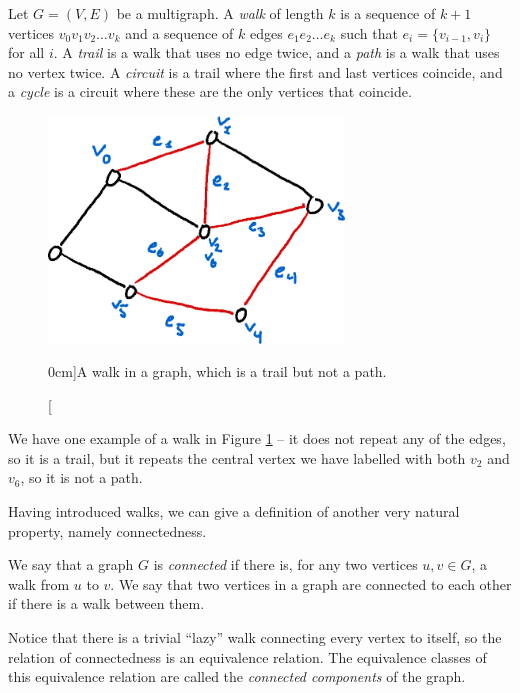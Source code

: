 \documentclass[nobib]{tufte-handout}
\begin{document}
\begin{definition}
    Let $G = (V, E)$ be a multigraph. A \emph{walk} of length $k$ is a sequence of $k+1$ vertices $v_0 v_1 v_2\ldots v_k$ and a sequence of $k$ edges $e_1e_2\ldots e_k$ such that $e_i = \{v_{i-1}, v_i\}$ for all $i$. A \emph{trail} is a walk that uses no edge twice, and a \emph{path} is a walk that uses no vertex twice. A \emph{circuit} is a trail where the first and last vertices coincide, and a \emph{cycle} is a circuit where these are the only vertices that coincide.
\end{definition}

\begin{figure}
    \centering
    \includegraphics[width=0.7\textwidth]{graphics/L2_eulerianity_subgraphs/walk_in_graph.png}
    \caption[][0cm]{A walk in a graph, which is a trail but not a path.}
    \label{fig:walk_in_graph}
\end{figure}

We have one example of a walk in Figure \ref{fig:walk_in_graph} -- it does not repeat any of the edges, so it is a trail, but it repeats the central vertex we have labelled with both $v_2$ and $v_6$, so it is not a path.

Having introduced walks, we can give a definition of another very natural property, namely connectedness.

\begin{definition}
  We say that a graph $G$ is \emph{connected} if there is, for any two vertices $u, v \in G$, a walk from $u$ to $v$. We say that two vertices in a graph are connected to each other if there is a walk between them.

  Notice that there is a trivial ``lazy'' walk connecting every vertex to itself, so the relation of connectedness is an equivalence relation. The equivalence classes of this equivalence relation are called the \emph{connected components} of the graph.
\end{definition}
\end{document}
